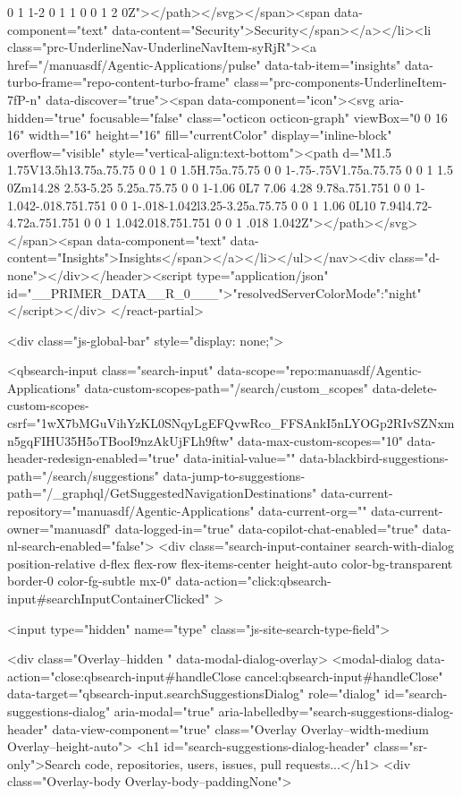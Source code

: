 {{0 1 1-2 0 1 1 0 0 1 2 0Z"></path></svg></span><span data-component="text" data-content="Security">Security</span></a></li><li class="prc-UnderlineNav-UnderlineNavItem-syRjR"><a href="/manuasdf/Agentic-Applications/pulse" data-tab-item="insights" data-turbo-frame="repo-content-turbo-frame" class="prc-components-UnderlineItem-7fP-n" data-discover="true"><span data-component="icon"><svg aria-hidden="true" focusable="false" class="octicon octicon-graph" viewBox="0 0 16 16" width="16" height="16" fill="currentColor" display="inline-block" overflow="visible" style="vertical-align:text-bottom"><path d="M1.5 1.75V13.5h13.75a.75.75 0 0 1 0 1.5H.75a.75.75 0 0 1-.75-.75V1.75a.75.75 0 0 1 1.5 0Zm14.28 2.53-5.25 5.25a.75.75 0 0 1-1.06 0L7 7.06 4.28 9.78a.751.751 0 0 1-1.042-.018.751.751 0 0 1-.018-1.042l3.25-3.25a.75.75 0 0 1 1.06 0L10 7.94l4.72-4.72a.751.751 0 0 1 1.042.018.751.751 0 0 1 .018 1.042Z"></path></svg></span><span data-component="text" data-content="Insights">Insights</span></a></li></ul></nav><div class="d-none"></div></header><script type="application/json" id="__PRIMER_DATA__R_0___">{"resolvedServerColorMode":"night"}</script></div>
</react-partial>


      <div class="js-global-bar" style="display: none;">
        


<qbsearch-input class="search-input" data-scope="repo:manuasdf/Agentic-Applications" data-custom-scopes-path="/search/custom_scopes" data-delete-custom-scopes-csrf="1wX7bMGuVihYzKL0SNqyLgEFQvwRco_FFSAnkI5nLYOGp2RIvSZNxmn5gqFIHU35H5oTBooI9nzAkUjFLh9ftw" data-max-custom-scopes="10" data-header-redesign-enabled="true" data-initial-value="" data-blackbird-suggestions-path="/search/suggestions" data-jump-to-suggestions-path="/_graphql/GetSuggestedNavigationDestinations" data-current-repository="manuasdf/Agentic-Applications" data-current-org="" data-current-owner="manuasdf" data-logged-in="true" data-copilot-chat-enabled="true" data-nl-search-enabled="false">
  <div
    class="search-input-container search-with-dialog position-relative d-flex flex-row flex-items-center height-auto color-bg-transparent border-0 color-fg-subtle mx-0"
    data-action="click:qbsearch-input#searchInputContainerClicked"
  >

    <input type="hidden" name="type" class="js-site-search-type-field">

    
<div class="Overlay--hidden " data-modal-dialog-overlay>
  <modal-dialog data-action="close:qbsearch-input#handleClose cancel:qbsearch-input#handleClose" data-target="qbsearch-input.searchSuggestionsDialog" role="dialog" id="search-suggestions-dialog" aria-modal="true" aria-labelledby="search-suggestions-dialog-header" data-view-component="true" class="Overlay Overlay--width-medium Overlay--height-auto">
      <h1 id="search-suggestions-dialog-header" class="sr-only">Search code, repositories, users, issues, pull requests...</h1>
    <div class="Overlay-body Overlay-body--paddingNone">
      
}}
